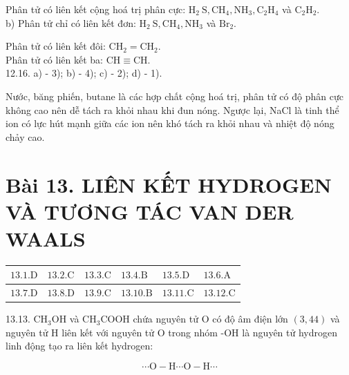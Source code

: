\documentclass[10pt]{article}
\begin{document}
Phân tử có liên kết cộng hoá trị phân cực: $\mathrm{H}_{2} \mathrm{~S}, \mathrm{CH}_{4}, \mathrm{NH}_{3}, \mathrm{C}_{2} \mathrm{H}_{4}$ và $\mathrm{C}_{2} \mathrm{H}_{2}$.\\
b) Phân tử chỉ có liên kết đơn: $\mathrm{H}_{2} \mathrm{~S}, \mathrm{CH}_{4}, \mathrm{NH}_{3}$ và $\mathrm{Br}_{2}$.

Phân tử có liên kết đôi: $\mathrm{CH}_{2}=\mathrm{CH}_{2}$.\\
Phân tử có liên kết ba: $\mathrm{CH} \equiv \mathrm{CH}$.\\
12.16. a) - 3); b) - 4); c) - 2); d) - 1).

Nước, băng phiến, butane là các hợp chất cộng hoá trị, phân tử có độ phân cực không cao nên dễ tách ra khỏi nhau khi đun nóng. Ngược lại, NaCl là tinh thể ion có lực hút mạnh giữa các ion nên khó tách ra khỏi nhau và nhiệt độ nóng chảy cao.

\section*{Bài 13. LIÊN KẾT HYDROGEN VÀ TƯƠNG TÁC VAN DER WAALS}
\begin{center}
\begin{tabular}{|l|l|l|l|l|l|}
\hline
$13.1 . \mathrm{D}$ & $13.2 . \mathrm{C}$ & $13.3 . \mathrm{C}$ & $13.4 . \mathrm{B}$ & $13.5 . \mathrm{D}$ & $13.6 . \mathrm{A}$ \\
\hline
$13.7 . \mathrm{D}$ & $13.8 . \mathrm{D}$ & $13.9 . \mathrm{C}$ & $13.10 . \mathrm{B}$ & $13.11 . \mathrm{C}$ & $13.12 . \mathrm{C}$ \\
\hline
\end{tabular}
\end{center}

13.13. $\mathrm{CH}_{3} \mathrm{OH}$ và $\mathrm{CH}_{3} \mathrm{COOH}$ chứa nguyên tử O có độ âm điện lớn $(3,44)$ và nguyên tử H liên kết với nguyên tử O trong nhóm -OH là nguyên tử hydrogen linh động tạo ra liên kết hydrogen:

$$
\cdots \mathrm{O}-\mathrm{H} \cdots \mathrm{O}-\mathrm{H} \cdots
$$
\end{document}

